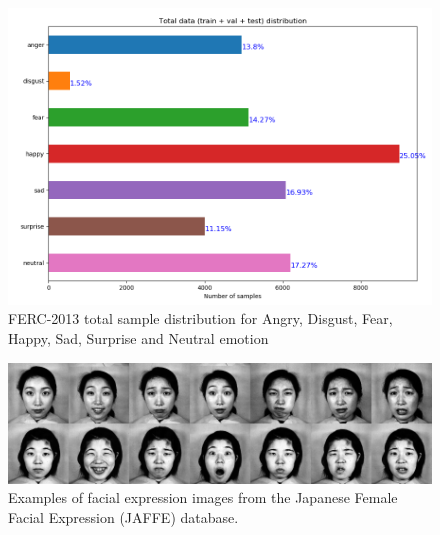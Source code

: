 \documentclass[master]{thesis-uestc}
\begin{document}
\begin{figure}[ht]
\includegraphics[width=5in]{pic/total_data_distribution.png}
\caption{FERC-2013 total sample distribution for Angry, Disgust, Fear, Happy, Sad, Surprise and Neutral emotion}
\label{fer2013_distribution}
\end{figure}

\begin{figure}[ht]
\includegraphics[width=5in]{pic/jaffe.png}
\caption{Examples of facial expression images from the Japanese Female Facial Expression (JAFFE) database.}
\label{jaffe_images}
\end{figure}
\end{document}
